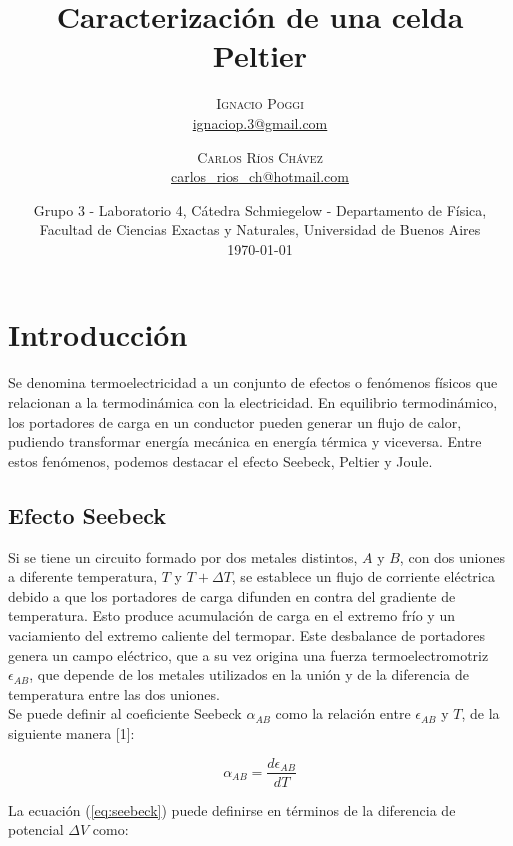 \documentclass[twoside,twocolumn,a4paper]{article}
\title{Caracterizaci\'on de una celda Peltier} %
\author{%
\textsc{Ignacio Poggi} \\[1ex] %
\normalsize \href{mailto:ignaciop.3@gmail.com}{ignaciop.3@gmail.com} %
\and %
\textsc{Carlos R\'ios Ch\'avez} \\[1ex] %
\normalsize \href{mailto:carlos_rios_ch@hotmail.com}{carlos\_rios\_ch@hotmail.com} %
}
\date{Grupo 3 - Laboratorio 4, C\'atedra Schmiegelow - Departamento de F\'isica, Facultad de Ciencias Exactas y Naturales, Universidad de Buenos Aires \newline \\ \today} %
\begin{document}
\maketitle



\section{Introducci\'on}


Se denomina termoelectricidad a un conjunto de efectos o fen\'omenos f\'isicos que relacionan a la termodin\'amica con la electricidad. En equilibrio termodin\'amico, los portadores de carga en un conductor pueden generar un flujo de calor, pudiendo transformar energ\'ia mec\'anica en energ\'ia t\'ermica y viceversa. Entre estos fen\'omenos, podemos destacar el efecto Seebeck, Peltier y Joule.

\subsection{Efecto Seebeck}

Si se tiene un circuito formado por dos metales distintos, $A$ y $B$, con dos uniones a diferente temperatura, $T$ y $T + \Delta T$, se establece un flujo de corriente el\'ectrica debido a que los portadores de carga difunden en contra del gradiente de temperatura. Esto produce acumulaci\'on de carga en el extremo fr\'io y un vaciamiento del extremo caliente del termopar. Este desbalance de portadores genera un campo el\'ectrico, que a su vez origina una fuerza termoelectromotriz $\epsilon_{AB}$, que depende de los metales utilizados en la uni\'on y de la diferencia de temperatura entre las dos uniones.\\

Se puede definir al coeficiente Seebeck $\alpha_{AB}$ como la relaci\'on entre $\epsilon_{AB}$ y $T$, de la siguiente manera [1]:

\begin{equation}
\label{eq:seebeck}
\alpha_{AB} = \frac{d\epsilon_{AB}}{dT}
\end{equation}

La ecuaci\'on (\ref{eq:seebeck}) puede definirse en t\'erminos de la diferencia de potencial $\Delta V$ como:
\end{document}
